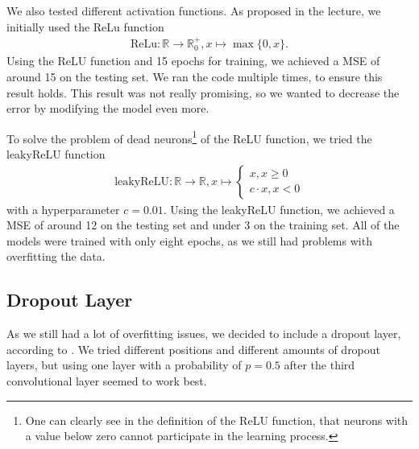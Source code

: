 \documentclass[conference]{IEEEtran}
\begin{document}
We also tested different activation functions. As proposed in the lecture, we initially used the ReLu
function
\begin{align*}
\mathrm{ReLu}: \mathbb{R} \to \mathbb{R}_0^+, x \mapsto \max\{0,x\}.
\end{align*}
Using the ReLU function and 15 epochs for training, we achieved a MSE of around 15 on the 
testing set. We ran the code multiple times, to ensure this result holds. This result was not really 
promising, so we wanted to decrease the error by modifying the model even more.

To solve the problem of dead neurons\footnote{One can clearly see in the definition of the ReLU 
function, that neurons with a value below zero cannot participate in the learning process.} of the ReLU function, we 
tried the leakyReLU function
\begin{align*}
\mathrm{leakyReLU} : \mathbb{R} \to \mathbb{R}, x \mapsto \begin{cases}
x, x \geq 0\\
c \cdot x, x <0
\end{cases}
\end{align*}
with a hyperparameter $c{=}0.01$. Using the leakyReLU function, we achieved a MSE of around 12 on the 
testing set and under 3 on the training set. All of the models were trained with only eight epochs, as 
we still had problems with overfitting the data.

\subsection{Dropout Layer}
As we still had a lot of overfitting issues, we decided to include a dropout layer, according to 
\cite{Dropout2014}. We tried different positions and different amounts of dropout layers, but using one 
layer with a probability of $p{=}0.5$ after the third convolutional layer seemed to work best.
\end{document}
